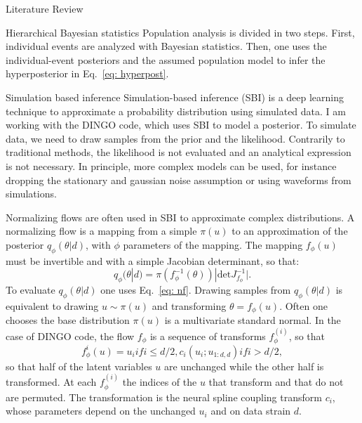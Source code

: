 \documentclass[a4paper, 12pt, twoside, openright, titlepage]{book}
\begin{document}
\begin{chapter}{Literature Review}
\begin{section}{Hierarchical Bayesian statistics}
Population analysis is divided in two steps.
First, individual events are analyzed with Bayesian statistics. 
Then, one uses the individual-event posteriors and the assumed population model to infer the hyperposterior in Eq.~\ref{eq: hyperpost}.

\end{section}



\begin{section}{Simulation based inference}
Simulation-based inference (SBI) is a deep learning technique to approximate a probability distribution using simulated data.
I am working with the DINGO code, which uses SBI to model a posterior.
To simulate data, we need to draw samples from the prior and the likelihood.
Contrarily to traditional methods, the likelihood is not evaluated and an analytical expression is not necessary. 
In principle, more complex models can be used, for instance dropping the stationary and gaussian noise assumption or using waveforms from simulations.


Normalizing flows are often used in SBI to approximate complex distributions.
A normalizing flow is a mapping from a simple $\pi(u)$ to an approximation of the posterior $q_{\phi}(\theta|d)$, with $\phi$ parameters of the mapping. 
The mapping $f_{\phi}(u)$ must be invertible and with a simple Jacobian determinant, so that:
\begin{equation}
\label{eq: nf}
q_{\phi}(\theta|d) = \pi(f_{\phi}^{-1}(\theta))|\textrm{det}J_{f_{\phi}}^{-1}|.
\end{equation}
To evaluate $q_{\phi}(\theta|d)$ one uses Eq.~\ref{eq: nf}. Drawing samples from $q_{\phi}(\theta|d)$ is equivalent to drawing $u\sim\pi(u)$ and transforming $\theta=f_{\phi}(u)$.
Often one chooses the base distribution $\pi(u)$ is a multivariate standard normal.
In the case of DINGO code, the flow $f_{\phi}$ is a sequence of transforms $f_{\phi}^{(i)}$, so that
\begin{equation}
f_{\phi}^{i}(u) = u_{i} if i\leq d/2, c_{i}(u_{i}; u_{1:d, d}) if i> d/2,
\end{equation}
so that half of the latent variables $u$ are unchanged while the other half is transformed.
At each $f_{\phi}^{(i)}$ the indices of the $u$ that transform and that do not are permuted.
The transformation is the neural spline coupling transform $c_{i}$, whose parameters depend on the unchanged $u_{i}$ and on data strain $d$.


\end{section}
\end{chapter}
\end{document}
